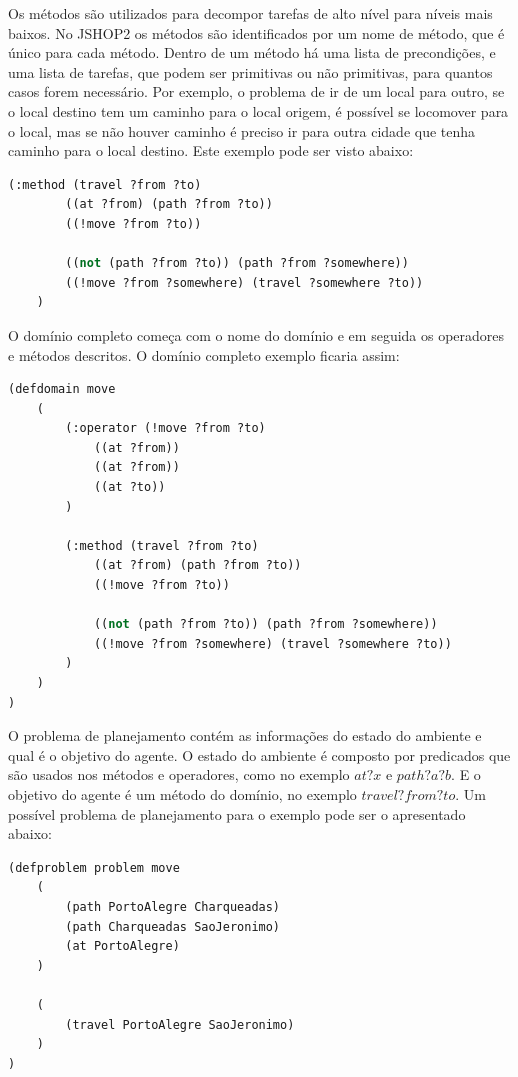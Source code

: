 Os métodos são utilizados para decompor tarefas de alto nível para níveis mais baixos. 
No JSHOP2 os métodos são identificados por um nome de método, que é único para cada método. 
Dentro de um método há uma lista de precondições, e uma lista de tarefas, que podem ser primitivas ou não primitivas, para quantos casos forem necessário. 
Por exemplo, o problema de ir de um local para outro, se o local destino tem um caminho para o local origem, é possível se locomover para o local, mas se não houver caminho é preciso ir para outra cidade que tenha caminho para o local destino. 
Este exemplo pode ser visto abaixo:

\lstset{style=codeStyle}
\begin{lstlisting}[language=lisp]
	(:method (travel ?from ?to)
		((at ?from) (path ?from ?to))
		((!move ?from ?to))
		
		((not (path ?from ?to)) (path ?from ?somewhere))
		((!move ?from ?somewhere) (travel ?somewhere ?to))
	)
\end{lstlisting}

O domínio completo começa com o nome do domínio e em seguida os operadores e métodos descritos. O domínio completo exemplo ficaria assim: 

\lstset{style=codeStyle}
\begin{lstlisting}[language=lisp]
(defdomain move
	(
		(:operator (!move ?from ?to) 
			((at ?from)) 
			((at ?from))
			((at ?to))
		)
	
		(:method (travel ?from ?to)
			((at ?from) (path ?from ?to))
			((!move ?from ?to))
		
			((not (path ?from ?to)) (path ?from ?somewhere))
			((!move ?from ?somewhere) (travel ?somewhere ?to))
		)    
	)
)
\end{lstlisting}

O problema de planejamento contém as informações do estado do ambiente e qual é o objetivo do agente. 
O estado do ambiente é composto por predicados que são usados nos métodos e operadores, como no exemplo $at ?x$ e $path ?a ?b$. E o objetivo do agente é um método do domínio, no exemplo $travel ?from ?to$. Um possível problema de planejamento para o exemplo pode ser o apresentado abaixo:


\begin{lstlisting}[language=lisp]
(defproblem problem move
	( 
		(path PortoAlegre Charqueadas)
		(path Charqueadas SaoJeronimo)
		(at PortoAlegre)
	)
	
	(
		(travel PortoAlegre SaoJeronimo)
	)
)
\end{lstlisting}

